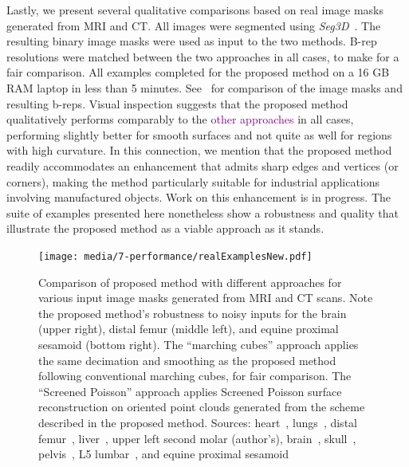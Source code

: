 Lastly, we present several qualitative comparisons based on real image masks generated from MRI and CT.  All images were segmented using \textit{Seg3D}~\cite{Seg3D}. The resulting binary image masks were used as input to the two methods. B-rep resolutions were matched between the two approaches in all cases, to make for a fair comparison. All examples completed for the proposed method on a 16 GB RAM laptop in less than 5 minutes. See~ for comparison of the image masks and resulting b-reps. Visual inspection suggests that the proposed method qualitatively performs comparably to the \textcolor{purple}{other approaches} in all cases, performing slightly better for smooth surfaces and not quite as well for regions with high curvature. In this connection, we mention that the proposed method readily accommodates an enhancement that admits sharp edges and vertices (or corners), making the method particularly suitable for industrial applications involving manufactured objects.  Work on this enhancement is in progress.  The suite of examples presented here nonetheless show a robustness and quality that illustrate the proposed method as a viable approach as it stands.
\begin{figure}[h!]
	\centering
	 \texttt{[image: media/7-performance/realExamplesNew.pdf]}
	\caption{Comparison of proposed method with different approaches for various input image masks generated from MRI and CT scans. Note the proposed method's robustness to noisy inputs for the brain (upper right), distal femur (middle left), and equine proximal sesamoid (bottom right). The ``marching cubes'' approach applies the same decimation and smoothing as the proposed method following conventional marching cubes, for fair comparison. The ``Screened Poisson'' approach applies Screened Poisson surface reconstruction on oriented point clouds generated from the scheme described in the proposed method. Sources: heart~\cite{cvgg}, lungs~\cite{rikxoort_2009}, distal femur~\cite{epperson_2013}, liver~\cite{bilic_2019}, upper left second molar (author's), brain~\cite{marcus_2007}, skull~\cite{clark_2013}, pelvis~\cite{clark_2013}, L5 lumbar~\cite{yao_2016}, and equine proximal sesamoid~\cite{shaffer2021}}
	\label{fig:example-meshes}
\end{figure}